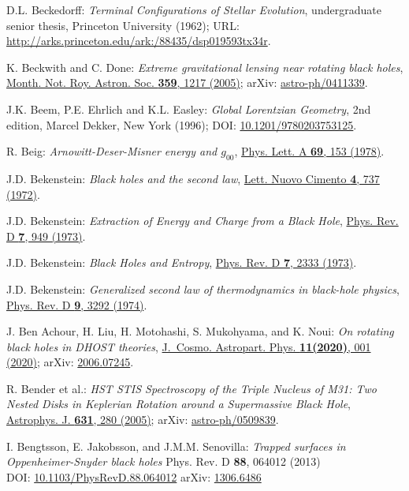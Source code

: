 \begin{thebibliography}{123}
D.L. Beckedorff:
{\em Terminal Configurations of Stellar Evolution},
undergraduate senior thesis, Princeton University (1962);
URL: \url{http://arks.princeton.edu/ark:/88435/dsp019593tx34r}.

K. Beckwith and C. Done:
{\em Extreme gravitational lensing near rotating black holes},
\href{https://doi.org/10.1111/j.1365-2966.2005.08980.x}{Month. Not. Roy. Astron. Soc. {\bf 359}, 1217 (2005)};
arXiv: \href{https://arxiv.org/abs/astro-ph/0411339}{astro-ph/0411339}.

J.K. Beem, P.E. Ehrlich and K.L. Easley:
{\em Global Lorentzian Geometry}, 2nd edition,
Marcel Dekker, New York (1996);
DOI: \href{https://doi.org/10.1201/9780203753125}{10.1201/9780203753125}.

R. Beig:
{\em Arnowitt-Deser-Misner energy and $g_{00}$},
\href{https://doi.org/10.1016/0375-9601(78)90198-6}{Phys. Lett. A {\bf 69}, 153 (1978)}.

J.D. Bekenstein:
{\em Black holes and the second law},
\href{https://doi.org/10.1007/BF02757029}{Lett. Nuovo Cimento {\bf 4}, 737 (1972)}.

J.D. Bekenstein:
{\em Extraction of Energy and Charge from a Black Hole},
\href{https://doi.org/10.1103/PhysRevD.7.949}{Phys. Rev. D {\bf 7}, 949 (1973)}.

J.D. Bekenstein:
{\em Black Holes and Entropy},
\href{https://doi.org/10.1103/PhysRevD.7.2333}{Phys. Rev. D {\bf 7}, 2333 (1973)}.

J.D. Bekenstein:
{\em Generalized second law of thermodynamics in black-hole physics},
\href{https://doi.org/10.1103/PhysRevD.9.3292}{Phys. Rev. D {\bf 9}, 3292 (1974)}.

J. Ben Achour, H. Liu, H. Motohashi, S. Mukohyama, and K. Noui:
{\em On rotating black holes in DHOST theories},
\href{https://doi.org/10.1088/1475-7516/2020/11/001}{J.~Cosmo. Astropart. Phys. {\bf 11(2020)}, 001 (2020)};
arXiv: \href{https://arxiv.org/abs/2006.07245}{2006.07245}.

R. Bender et al.:
{\em HST STIS Spectroscopy of the Triple Nucleus of M31: Two Nested Disks in Keplerian Rotation around a Supermassive Black Hole},
\href{https://doi.org/10.1086/432434}{Astrophys. J. {\bf 631}, 280 (2005)};
arXiv: \href{https://arxiv.org/abs/astro-ph/0509839}{astro-ph/0509839}.

I. Bengtsson, E. Jakobsson, and J.M.M. Senovilla:
{\em Trapped surfaces in Oppenheimer-Snyder black holes}
Phys. Rev. D {\bf 88}, 064012 (2013)\\
DOI: \href{https://doi.org/10.1103/PhysRevD.88.064012}{10.1103/PhysRevD.88.064012}\hfill
arXiv: \href{https://arxiv.org/abs/1306.6486}{1306.6486}


\end{thebibliography}
